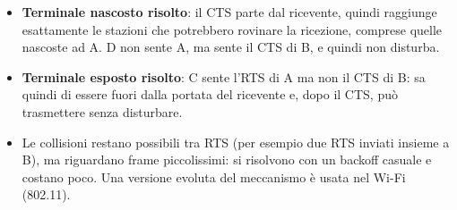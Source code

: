 \begin{itemize}
    \item \textbf{Terminale nascosto risolto}: il CTS parte dal ricevente, quindi raggiunge esattamente le stazioni che potrebbero
          rovinare la ricezione, comprese quelle nascoste ad A. D non sente A, ma sente il CTS di B, e quindi non disturba.
    \item \textbf{Terminale esposto risolto}: C sente l'RTS di A ma non il CTS di B: sa quindi di essere fuori dalla portata del ricevente e, dopo il
          CTS, può trasmettere senza disturbare.
    \item Le collisioni restano possibili tra RTS (per esempio due RTS inviati insieme a B), ma riguardano frame piccolissimi: si risolvono con un
          backoff casuale e costano poco. Una versione evoluta del meccanismo è usata nel Wi-Fi (802.11).
\end{itemize}

